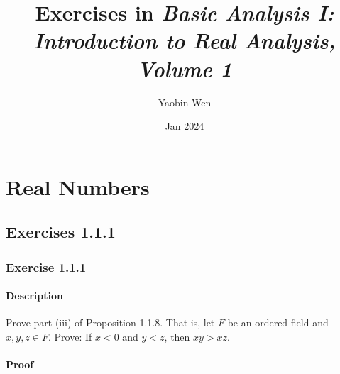 \documentclass[12pt, letterpaper, oneside]{book}
\title{Exercises in \textit{Basic Analysis I: Introduction to Real Analysis, Volume 1}}
\author{Yaobin Wen}
\date{Jan 2024}
\begin{document}
\maketitle
\tableofcontents

%
%

\chapter{Real Numbers}

\section{Exercises 1.1.1}

\subsection{Exercise 1.1.1}

\subsubsection{Description}

Prove part (iii) of Proposition 1.1.8. That is, let $F$ be an ordered field and $x, y, z \in F$. Prove: If $x < 0$ and
$y < z$, then $xy > xz$.

\subsubsection{Proof}
\end{document}
